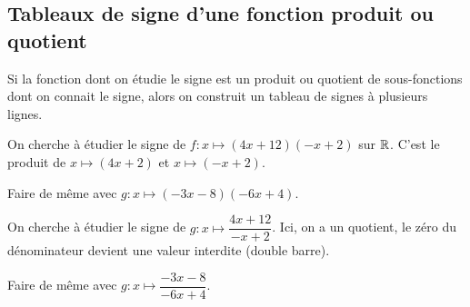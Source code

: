 \documentclass{poly}
\begin{document}
\newpage
\subsection{Tableaux de signe d'une fonction produit ou quotient}
\begin{remark}
Si la fonction dont on étudie le signe est un produit ou quotient de sous-fonctions dont on connait le signe, alors on construit un tableau de signes à plusieurs lignes.
\end{remark}
\begin{example}
On cherche à étudier le signe de $f : x \mapsto (4x + 12)(-x + 2)$ sur $\mathbb{R}$. C'est le produit de $x \mapsto (4x + 2)$ et $x \mapsto (-x + 2)$.
\begin{center}
\end{center}
Faire de même avec $g : x \mapsto (-3x - 8)(-6x + 4)$.
\end{example}
\begin{example}
On cherche à étudier le signe de $g : x \mapsto \dfrac{4x + 12}{-x + 2}$. Ici, on a un quotient, le zéro du dénominateur devient une valeur interdite (double barre).
\begin{center}
\end{center}
Faire de même avec $g : x \mapsto \dfrac{-3x - 8}{-6x + 4}$.
\end{example}
\newpage
\end{document}
